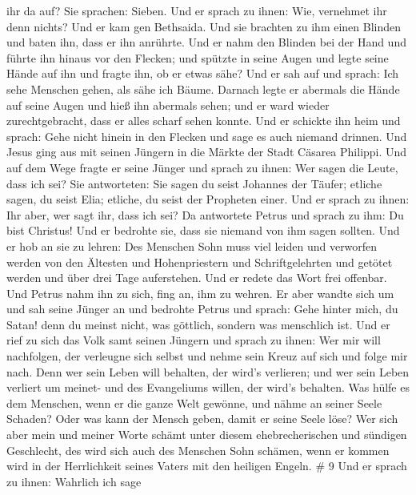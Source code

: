 ihr da auf? Sie sprachen: Sieben.  Und er sprach zu ihnen:
Wie, vernehmet ihr denn nichts?  Und er kam gen Bethsaida.
Und sie brachten zu ihm einen Blinden und baten ihn, dass er ihn
anrührte.  Und er nahm den Blinden bei der Hand und führte
ihn hinaus vor den Flecken; und spützte in seine Augen und legte seine
Hände auf ihn und fragte ihn, ob er etwas sähe?  Und er sah
auf und sprach: Ich sehe Menschen gehen, als sähe ich Bäume.
 Darnach legte er abermals die Hände auf seine Augen und
hieß ihn abermals sehen; und er ward wieder zurechtgebracht, dass er
alles scharf sehen konnte.  Und er schickte ihn heim und
sprach: Gehe nicht hinein in den Flecken und sage es auch niemand
drinnen.  Und Jesus ging aus mit seinen Jüngern in die
Märkte der Stadt Cäsarea Philippi. Und auf dem Wege fragte er seine
Jünger und sprach zu ihnen: Wer sagen die Leute, dass ich sei?
 Sie antworteten: Sie sagen du seist Johannes der Täufer;
etliche sagen, du seist Elia; etliche, du seist der Propheten einer.
 Und er sprach zu ihnen: Ihr aber, wer sagt ihr, dass ich
sei? Da antwortete Petrus und sprach zu ihm: Du bist Christus!
 Und er bedrohte sie, dass sie niemand von ihm sagen
sollten.  Und er hob an sie zu lehren: Des Menschen Sohn
muss viel leiden und verworfen werden von den Ältesten und
Hohenpriestern und Schriftgelehrten und getötet werden und über drei
Tage auferstehen.  Und er redete das Wort frei offenbar.
Und Petrus nahm ihn zu sich, fing an, ihm zu wehren.  Er
aber wandte sich um und sah seine Jünger an und bedrohte Petrus und
sprach: Gehe hinter mich, du Satan! denn du meinst nicht, was göttlich,
sondern was menschlich ist.  Und er rief zu sich das Volk
samt seinen Jüngern und sprach zu ihnen: Wer mir will nachfolgen, der
verleugne sich selbst und nehme sein Kreuz auf sich und folge mir nach.
 Denn wer sein Leben will behalten, der wird's verlieren;
und wer sein Leben verliert um meinet- und des Evangeliums willen, der
wird's behalten.  Was hülfe es dem Menschen, wenn er die
ganze Welt gewönne, und nähme an seiner Seele Schaden? 
Oder was kann der Mensch geben, damit er seine Seele löse? 
Wer sich aber mein und meiner Worte schämt unter diesem ehebrecherischen
und sündigen Geschlecht, des wird sich auch des Menschen Sohn schämen,
wenn er kommen wird in der Herrlichkeit seines Vaters mit den heiligen
Engeln. \# 9  Und er sprach zu ihnen: Wahrlich ich sage

